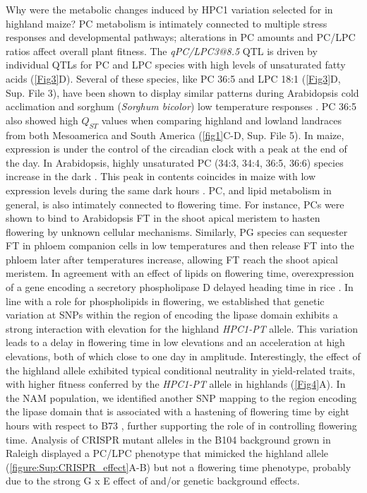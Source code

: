 Why were the metabolic changes induced by HPC1 variation selected for in highland maize?
PC metabolism is intimately connected to multiple stress responses and developmental pathways; alterations in PC amounts and PC/LPC ratios affect overall plant fitness.
The \textit{qPC/LPC3@8.5} QTL is driven by individual QTLs for PC and LPC species with high levels of unsaturated fatty acids (\cref{Fig3}D).
Several of these species, like PC 36:5 and LPC 18:1 (\cref{Fig3}D, Sup. File 3), have been shown to display similar patterns during Arabidopsis cold acclimation \citep{Welti2002-uk} and sorghum (\textit{Sorghum bicolor}) low temperature responses \citep{marla2017-ph}.
PC 36:5 also showed high $Q_{ST}$ values when comparing highland and lowland landraces from both Mesoamerica and South America (\cref{fig1}C-D, Sup. File 5).
In maize, \hpc expression is under the control of the circadian clock \citep{khan2010-iv} with a peak at the end of the day. 
In Arabidopsis, highly unsaturated PC (34:3, 34:4, 36:5, 36:6) species increase in the dark \citep{maatta2012-ip}. 
This peak in contents coincides in maize with low \hpc expression levels during the same dark hours \citep{khan2010-iv}.
PC, and lipid metabolism in general, is also intimately connected to flowering time. 
For instance, PCs were shown to bind to Arabidopsis FT in the shoot apical meristem to hasten flowering \citep{nakamura2014-qf, nakamura2019-ht} by unknown cellular mechanisms. 
Similarly, PG species can sequester FT in phloem companion cells in low temperatures \citep{susila2021-dz} and then release FT into the phloem later after temperatures increase, allowing FT reach the shoot apical meristem.   
In agreement with an effect of lipids on flowering time, overexpression of a gene encoding a secretory phospholipase D delayed heading time in rice \citep{qu2021-wc}.
In line with a role for phospholipids in flowering, we established that genetic variation at SNPs within the region of \hpc encoding the lipase domain exhibits a strong interaction with elevation for the highland \textit{HPC1-PT} allele. 
This variation leads to a delay in flowering time in low elevations and an acceleration at high elevations, both of which close to one day in amplitude. 
Interestingly, the effect of the highland \hpc allele exhibited typical conditional neutrality in yield-related traits, with higher fitness conferred by the \textit{HPC1-PT} allele in highlands (\cref{Fig4}A). 
In the NAM population, we identified another SNP mapping to the region encoding the lipase domain that is associated with a hastening of flowering time by eight hours with respect to B73 \citep{wallace2014-yy}, further supporting the role of \hpc in controlling flowering time. 
Analysis of \hpc CRISPR mutant alleles in the B104 background grown in Raleigh displayed a PC/LPC phenotype that mimicked the highland allele (\cref{figure:Sup:CRISPR_effect}A-B) but not a flowering time phenotype, probably due to the strong G x E effect of \hpc and/or genetic background effects. 

